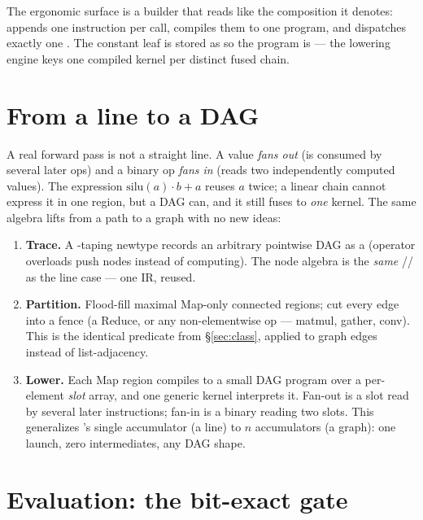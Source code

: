 \documentclass[11pt]{article}
\begin{document}
The ergonomic surface is a builder that reads like the composition it denotes:
appends one instruction per call, compiles them to one program, and dispatches exactly one
. The constant leaf is stored as  so the program is
 --- the lowering engine keys one compiled kernel per distinct fused chain.

\section{From a line to a DAG}
\label{sec:dag}

A real forward pass is not a straight line. A value \emph{fans out} (is consumed by several later ops)
and a binary op \emph{fans in} (reads two independently computed values). The expression
$\mathrm{silu}(a)\cdot b + a$ reuses $a$ twice; a linear chain cannot express it in one region, but a
DAG can, and it still fuses to \emph{one} kernel. The same algebra lifts from a path to a graph with no
new ideas:
\begin{enumerate}[leftmargin=1.5em,itemsep=1pt]
\item \textbf{Trace.} A -taping newtype records an arbitrary pointwise DAG as a
 (operator overloads push nodes instead of computing). The node algebra is the \emph{same}
// as the line case --- one IR, reused.
\item \textbf{Partition.} Flood-fill maximal Map-only connected regions; cut every edge into a fence
(a Reduce, or any non-elementwise op --- matmul, gather, conv). This is the identical 
predicate from \S\ref{sec:class}, applied to graph edges instead of list-adjacency.
\item \textbf{Lower.} Each Map region compiles to a small DAG program over a per-element \emph{slot}
array, and one generic  kernel interprets it. Fan-out is a slot read by several later
instructions; fan-in is a binary reading two slots. This generalizes 's single
accumulator (a line) to $n$ accumulators (a graph): one launch, zero intermediates, any DAG shape.
\end{enumerate}

\section{Evaluation: the bit-exact gate}
\label{sec:eval}
\end{document}
